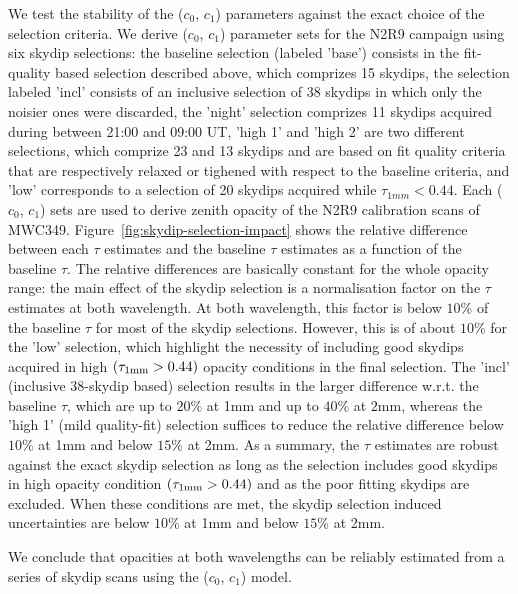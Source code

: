 


We test the stability of the ($c_0$, $c_1$) parameters against the
exact choice of the selection criteria.
We derive ($c_0$, $c_1$) parameter sets for the N2R9 campaign using
six skydip selections: the baseline selection (labeled 'base')
consists in the fit-quality based selection described above, which
comprizes 15 skydips, the selection labeled 'incl' consists of an
inclusive selection of 38 skydips in which only the noisier ones were
discarded, the 'night' selection comprizes 11 skydips acquired during
between 21:00 and 09:00 UT,
'high 1' and 'high 2' are two different selections, which comprize 23
and 13 skydips and are based on fit quality criteria that are
respectively relaxed or tighened with respect to the baseline criteria, 
and 'low' corresponds to a selection of 20 skydips acquired while
$\tau_{1mm} < 0.44$. Each ($c_0$, $c_1$) sets are used to derive
zenith opacity of the N2R9 calibration scans of MWC349. 
Figure~\ref{fig:skydip-selection-impact} shows the relative
difference between each $\tau$ estimates and the baseline $\tau$
estimates as a function of the baseline $\tau$. The relative
differences are basically constant for the whole opacity range: the
main effect of the skydip selection is a normalisation factor on the
$\tau$ estimates at both wavelength. At both wavelength, this factor
is below $10\%$ of the baseline $\tau$ for most of the skydip
selections. However, this is of about $10\%$ for the 'low' selection,
which highlight the necessity of including good skydips acquired in
high $(\tau_{1\rm{mm}} > 0.44)$ opacity conditions in the final
selection. The 'incl' (inclusive 38-skydip based) selection results in the larger
difference w.r.t. the baseline $\tau$, which are up to $20\%$ at 1mm
and up to $40\%$ at $2$mm, whereas the 'high 1' (mild quality-fit)
selection suffices to reduce the relative difference below $10\%$ at
1mm and below $15\%$ at 2mm.
As a summary, the $\tau$ estimates are robust against the exact skydip
selection as long as the selection includes good
skydips in high opacity condition $(\tau_{1\rm{mm}} > 0.44)$ and as the poor
fitting skydips are excluded. When these conditions are met, the
skydip selection induced uncertainties are below $10\%$ at 1mm and
below $15\%$ at 2mm. 

We conclude that opacities at both wavelengths can be reliably
estimated from a series of skydip scans using the ($c_0$, $c_1$) model.



